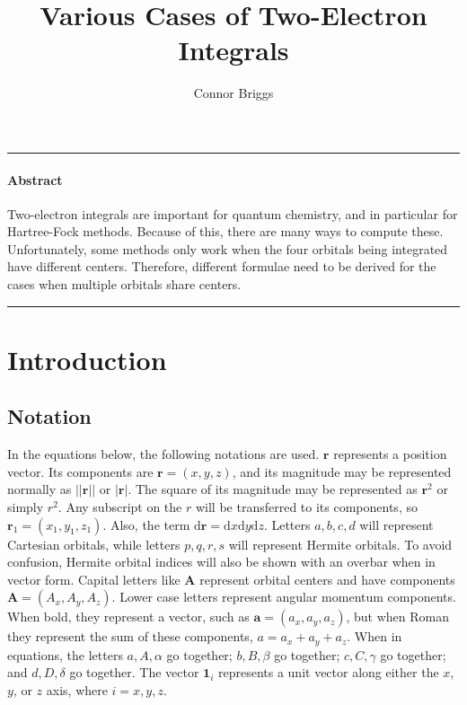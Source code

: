 \documentclass[twoside,10pt,draft]{article}
\begin{document}

\renewcommand\theequation{\thesection.\arabic{equation}}
\newcommand{\dvar}[1]{\ensuremath{\mathrm{d} #1}}
\newcommand{\dvarb}[1]{\ensuremath{\mathrm{d}\mathbf{#1}}}

\title{Various Cases of Two-Electron Integrals}
\author{Connor Briggs}
\maketitle

\hrule
\paragraph*{Abstract} Two-electron integrals are important for quantum chemistry, and in particular for Hartree-Fock methods. Because of this, there are many ways to compute these. Unfortunately, some methods only work when the four orbitals being integrated have different centers. Therefore, different formulae need to be derived for the cases when multiple orbitals share centers.\\
\hrule


\lhead[]{\thepage}
\rhead[\thepage]{}

\section{Introduction}

\subsection{Notation}

In the equations below, the following notations are used. $\mathbf{r}$ represents a position vector. Its components are $\mathbf{r} = (x, y, z)$, and its magnitude may be represented normally as $\left|\left|\mathbf{r}\right|\right|$ or $\left|\mathbf{r}\right|$. The square of its magnitude may be represented as $\mathbf{r}^2$ or simply $r^2$. Any subscript on the $r$ will be transferred to its components, so $\mathbf{r}_1 = \left(x_1, y_1, z_1\right)$. Also, the term $\dvarb{r} = \dvar{x}\dvar{y}\dvar{z}$. Letters $a, b, c, d$ will represent Cartesian orbitals, while letters $p, q, r, s$ will represent Hermite orbitals. To avoid confusion, Hermite orbital indices will also be shown with an overbar when in vector form. Capital letters like $\mathbf{A}$ represent orbital centers and have components $\mathbf{A} = \left(A_x, A_y, A_z\right)$. Lower case letters represent angular momentum components. When bold, they represent a vector, such as  $\mathbf{a} = \left(a_x, a_y, a_z\right)$, but when Roman they represent the sum of these components, $a = a_x + a_y + a_z$. When in equations, the letters $a, A, \alpha$ go together; $b, B, \beta$ go together; $c, C, \gamma$ go together; and $d, D, \delta$ go together. The vector $\mathbf{1}_i$ represents a unit vector along either the $x$, $y$, or $z$ axis, where $i = x, y, z$.
\end{document}
